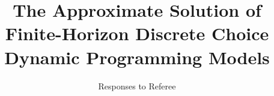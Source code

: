 \title{The Approximate Solution of Finite-Horizon Discrete Choice Dynamic Programming Models}
\subtitle{Responses to Referee}
\date{}

